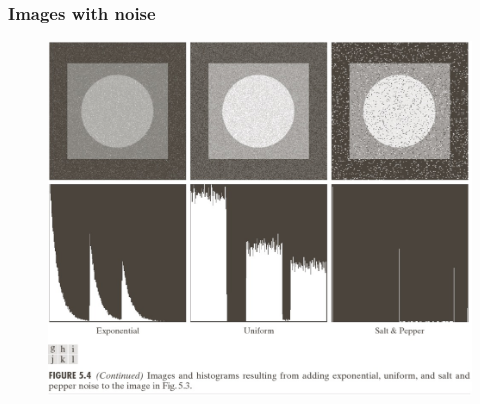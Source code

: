 \documentclass[english,11pt,table,handout]{beamer}
\begin{document}
{
	\frametitle{Images with noise}
	\begin{figure}[!h]
		\includegraphics[scale=0.6]{im_with_noise_2.png}
	\end{figure}
}
\end{document}
